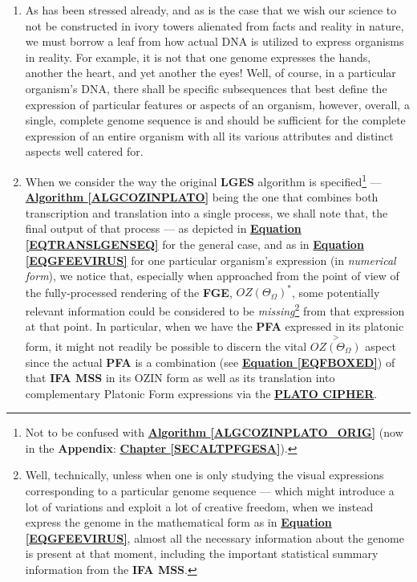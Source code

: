 \documentclass[a4paper, 18pt]{book} %
\begin{document}
\begin{enumerate}
\item As has been stressed already, and as is the case that we wish our science to not be constructed in ivory towers alienated from facts and reality in nature, we must borrow a leaf from how actual DNA is utilized to express organisms in reality. For example, it is not that one genome expresses the hands, another the heart, and yet another the eyes! Well, of course, in a particular organism's DNA, there shall be specific subsequences that best define the expression of particular features or aspects of an organism, however, overall, a single, complete genome sequence is and should be sufficient for the complete expression of an entire organism with all its various attributes and distinct aspects well catered for.
\item When we consider the way the original \textbf{LGES} algorithm is specified\footnote{Not to be confused with \textbf{\hyperref[ALGCOZINPLATO_ORIG]{Algorithm \ref{ALGCOZINPLATO_ORIG}}} (now in the \textbf{Appendix}: \textbf{\hyperref[SECALTPFGESA]{Chapter \ref{SECALTPFGESA}}}).} --- \textbf{\hyperref[ALGCOZINPLATO]{Algorithm \ref{ALGCOZINPLATO}}}  being the one that combines both transcription and translation into a single process, we shall note that, the final output of that process --- as depicted in \textbf{\hyperref[EQTRANSLGENSEQ]{Equation \ref{EQTRANSLGENSEQ}}} for the general case, and as in \textbf{\hyperref[EQGFEEVIRUS]{Equation \ref{EQGFEEVIRUS}}} for one particular organism's expression (in \textit{numerical form}), we notice that, especially when approached from the point of view of the fully-processed rendering of the \textbf{FGE}, $\boxed{OZ(\Theta_\Omega)}^*$, some potentially relevant information could be considered to be \textit{missing}\footnote{Well, technically, unless when one is only studying the visual expressions corresponding to a particular genome sequence --- which might introduce a lot of variations and exploit a lot of creative freedom, when we instead express the genome in the mathematical form as in \textbf{\hyperref[EQGFEEVIRUS]{Equation \ref{EQGFEEVIRUS}}}, almost all the necessary information about the genome is present at that moment, including the important statistical summary information from the \textbf{IFA MSS}.} from that expression at that point. In particular, when we have the \textbf{PFA} expressed in its platonic form, it might not readily be possible to discern the vital $\overset{>}{OZ(\Theta_\Omega)}$ aspect since the actual \textbf{PFA} is a combination (see \textbf{\hyperref[EQFBOXED]{Equation \ref{EQFBOXED}}}) of that \textbf{IFA MSS} in its OZIN form as well as its translation into complementary Platonic Form expressions via the \textbf{\hyperref[FIGPLATONICCIPH]{PLATO CIPHER}}.

\end{enumerate}
\end{document}
